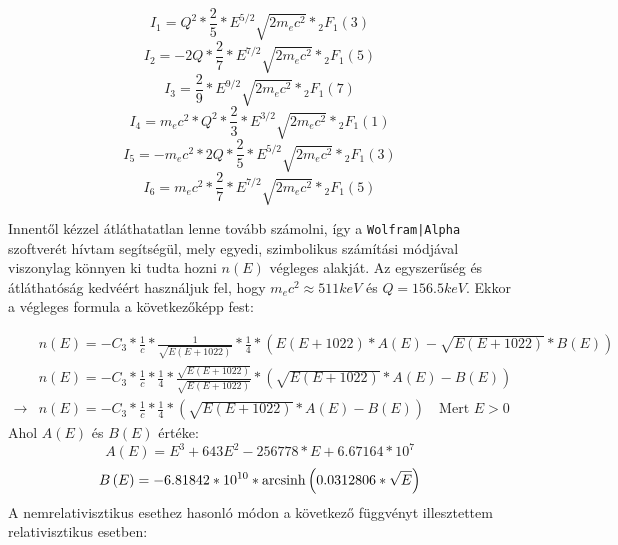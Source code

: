 \begin{multicols}{2}
\begin{equation} \label{eq:55}
I_{1}
=
Q^{2}
*
\frac{2}{5} * E^{5/2} \sqrt{2m_{e}c^{2}} * {}_2F_{1} \left( 3 \right)
\end{equation}
\begin{equation} \label{eq:56}
I_{2}
=
- 2Q
*
\frac{2}{7} * E^{7/2} \sqrt{2m_{e}c^{2}} * {}_2F_{1} \left( 5 \right)
\end{equation}
\begin{equation} \label{eq:57}
I_{3}
=
\frac{2}{9} * E^{9/2} \sqrt{2m_{e}c^{2}} * {}_2F_{1} \left( 7 \right)
\end{equation}
\begin{equation} \label{eq:58}
I_{4}
=
m_{e}c^{2} * Q^{2}
*
\frac{2}{3} * E^{3/2} \sqrt{2m_{e}c^{2}} * {}_2F_{1} \left( 1 \right)
\end{equation}
\begin{equation} \label{eq:59}
I_{5}
=
- m_{e}c^{2} * 2Q
*
\frac{2}{5} * E^{5/2} \sqrt{2m_{e}c^{2}} * {}_2F_{1} \left( 3 \right)
\end{equation}
\begin{equation} \label{eq:60}
I_{6}
=
m_{e}c^{2}
*
\frac{2}{7} * E^{7/2} \sqrt{2m_{e}c^{2}} * {}_2F_{1} \left( 5 \right)
\end{equation}
\end{multicols}
Innentől kézzel átláthatatlan lenne tovább számolni, így a \texttt{Wolfram|Alpha} szoftverét hívtam segítségül, mely egyedi, szimbolikus számítási módjával viszonylag könnyen ki tudta hozni $n \left( E \right)$ végleges alakját. Az egyszerűség és átláthatóság kedvéért használjuk fel, hogy $m_{e}c^{2} \approx 511 keV$ és $Q = 156.5 keV$. Ekkor a végleges formula a következőképp fest:

\begin{align} \label{eq:61}
&n \left( E \right)
=
- C_{3} * \frac{1}{c}
*
\frac{1}{\sqrt{E (E + 1022)}} * 
\frac{1}{4} *
\left(
E \left( E + 1022 \right) * A \left( E \right) - \sqrt{E \left(E + 1022 \right)} * B \left( E \right)
\right)
\nonumber \\
&n \left( E \right)
=
- C_{3} * \frac{1}{c}
*
\frac{1}{4}
*
\frac{\sqrt{E \left(E + 1022 \right)}}{\sqrt{E (E + 1022)}} * 
\left(
\sqrt{E \left(E + 1022 \right)} * A \left( E \right) - B \left( E \right)
\right)
\nonumber \\
\to &\boxed{
n \left( E \right)
=
- C_{3} * \frac{1}{c}
*
\frac{1}{4}
* 
\left(
\sqrt{E \left(E + 1022 \right)} * A \left( E \right) - B \left( E \right)
\right) \quad \text{Mert $E > 0$}
}
\end{align}
Ahol $A \left( E \right)$ és $B \left( E \right)$ értéke:
\begin{equation} \label{eq:62}
A \left( E \right)
=
E^{3} + 643 E^{2} - 256778 * E + 6.67164*10^{7}
\end{equation}
\begin{equation} \label{eq:63}
B \left( E \right)
=
- 6.81842*10^{10} * \operatorname{arcsinh} \left(0.0312806 * \sqrt{E} \right)
\end{equation}
A nemrelativisztikus esethez hasonló módon a következő függvényt illesztettem relativisztikus esetben:

